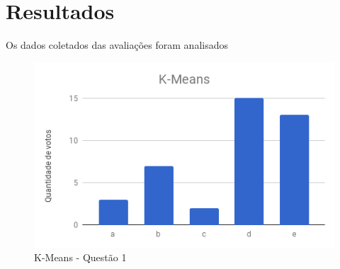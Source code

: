 






\section{Resultados}


Os dados coletados das avaliações foram analisados


  \begin{figure}[!h]
	  \centering
	  \includegraphics[width=.5\textwidth]{conteudo/capitulos/figs/figuras-experimento/Q1-KMeans.png}
	  \caption{K-Means - Questão 1}
	  \label{fig:grafico-medidas-tradicionais}
  \end{figure}


